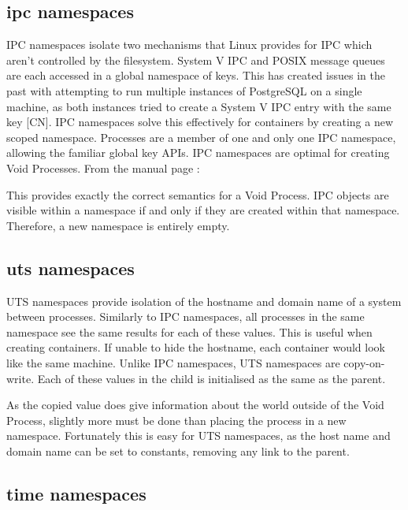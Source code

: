 \documentclass[sigplan]{acmart}
\begin{document}
\subsection{ipc namespaces}
\label{sec:voiding-ipc}

IPC namespaces isolate two mechanisms that Linux provides for IPC which aren't controlled by the filesystem. System V IPC and POSIX message queues are each accessed in a global namespace of keys. This has created issues in the past with attempting to run multiple instances of PostgreSQL on a single machine, as both instances tried to create a System V IPC entry with the same key [CN]. IPC namespaces solve this effectively for containers by creating a new scoped namespace. Processes are a member of one and only one IPC namespace, allowing the familiar global key APIs. IPC namespaces are optimal for creating Void Processes. From the manual page \citep{free_software_foundation_ipc_namespaces7_2021}:


This provides exactly the correct semantics for a Void Process. IPC objects are visible within a namespace if and only if they are created within that namespace. Therefore, a new namespace is entirely empty.

\subsection{uts namespaces}
\label{sec:voiding-uts}

UTS namespaces provide isolation of the hostname and domain name of a system between processes. Similarly to IPC namespaces, all processes in the same namespace see the same results for each of these values. This is useful when creating containers. If unable to hide the hostname, each container would look like the same machine. Unlike IPC namespaces, UTS namespaces are copy-on-write. Each of these values in the child is initialised as the same as the parent.

As the copied value does give information about the world outside of the Void Process, slightly more must be done than placing the process in a new namespace. Fortunately this is easy for UTS namespaces, as the host name and domain name can be set to constants, removing any link to the parent.

\subsection{time namespaces}
\label{sec:voiding-time}
\end{document}
